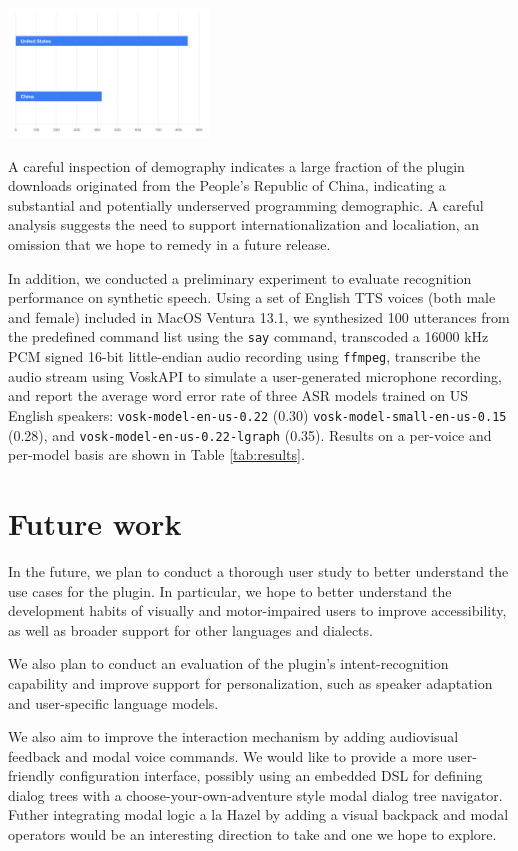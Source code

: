 \documentclass[conference]{IEEEtran}
\begin{document}
\begin{center}\includegraphics[width=0.40\textwidth]{demographics.png}\end{center}

A careful inspection of demography indicates a large fraction of the plugin downloads originated from the People's Republic of China, indicating a substantial and potentially underserved programming demographic. A careful analysis suggests the need to support internationalization and localiation, an omission that we hope to remedy in a future release.

In addition, we conducted a preliminary experiment to evaluate recognition performance on synthetic speech. Using a set of English TTS voices (both male and female) included in MacOS Ventura 13.1, we synthesized 100 utterances from the predefined command list using the \texttt{say} command, transcoded a 16000 kHz PCM signed 16-bit little-endian audio recording using \texttt{ffmpeg}, transcribe the audio stream using VoskAPI to simulate a user-generated microphone recording, and report the average word error rate of three ASR models trained on US English speakers: \texttt{vosk-model-en-us-0.22} (0.30) \texttt{vosk-model-small-en-us-0.15} (0.28), and \texttt{vosk-model-en-us-0.22-lgraph} (0.35). Results on a per-voice and per-model basis are shown in Table \ref{tab:results}.

\section{Future work}

In the future, we plan to conduct a thorough user study to better understand the use cases for the plugin. In particular, we hope to better understand the development habits of visually and motor-impaired users to improve accessibility, as well as broader support for other languages and dialects.

We also plan to conduct an evaluation of the plugin's intent-recognition capability and improve support for personalization, such as speaker adaptation and user-specific language models.

We also aim to improve the interaction mechanism by adding audiovisual feedback and modal voice commands. We would like to provide a more user-friendly configuration interface, possibly using an embedded DSL for defining dialog trees with a choose-your-own-adventure style modal dialog tree navigator. Futher integrating modal logic a la Hazel by adding a visual backpack and modal operators would be an interesting direction to take and one we hope to explore.
\end{document}
